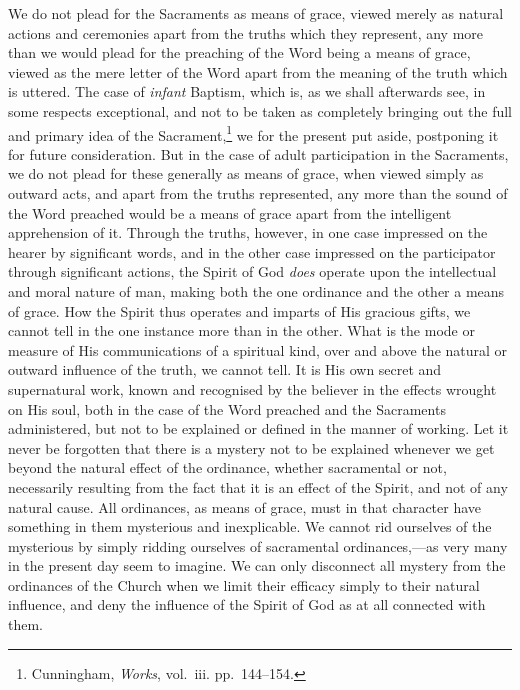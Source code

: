 \documentclass[english,]{book}
\begin{document}
We do not plead for the Sacraments as means of grace, viewed merely as natural actions and ceremonies apart from the truths which they represent, any more than we would plead for the preaching of the Word being a means of grace, viewed as the mere letter of the Word apart from the meaning of the truth which is uttered. The case of \emph{infant} Baptism, which is, as we shall afterwards see, in some respects exceptional, and not to be taken as completely bringing out the full and primary idea of the Sacrament,\footnote{Cunningham, \emph{Works}, vol.~iii. pp.~144--154.} we for the present put aside, postponing it for future consideration. But in the case of adult participation in the Sacraments, we do not plead for these generally as means of grace, when viewed simply as outward acts, and apart from the truths represented, any more than the sound of the Word preached would be a means of grace apart from the intelligent apprehension of it. Through the truths, however, in one case impressed on the hearer by significant words, and in the other case impressed on the participator through significant actions, the Spirit of God \emph{does} operate upon the intellectual and moral nature of man, making both the one ordinance and the other a means of grace. How the Spirit thus operates and imparts of His gracious gifts, we cannot tell in the one instance more than in the other. What is the mode or measure of His communications of a spiritual kind, over and above the natural or outward influence of the truth, we cannot tell. It is His own secret and supernatural work, known and recognised by the believer in the effects wrought on His soul, both in the case of the Word preached and the Sacraments administered, but not to be explained or defined in the manner of working. Let it never be forgotten that there is a mystery not to be explained whenever we get beyond the natural effect of the ordinance, whether sacramental or not, necessarily resulting from the fact that it is an effect of the Spirit, and not of any natural cause. All ordinances, as means of grace, must in that character have something in them mysterious and inexplicable. We cannot rid ourselves of the mysterious by simply ridding ourselves of sacramental ordinances,---as very many in the present day seem to imagine. We can only disconnect all mystery from the ordinances of the Church when we limit their efficacy simply to their natural influence, and deny the influence of the Spirit of God as at all connected with them.
\end{document}
